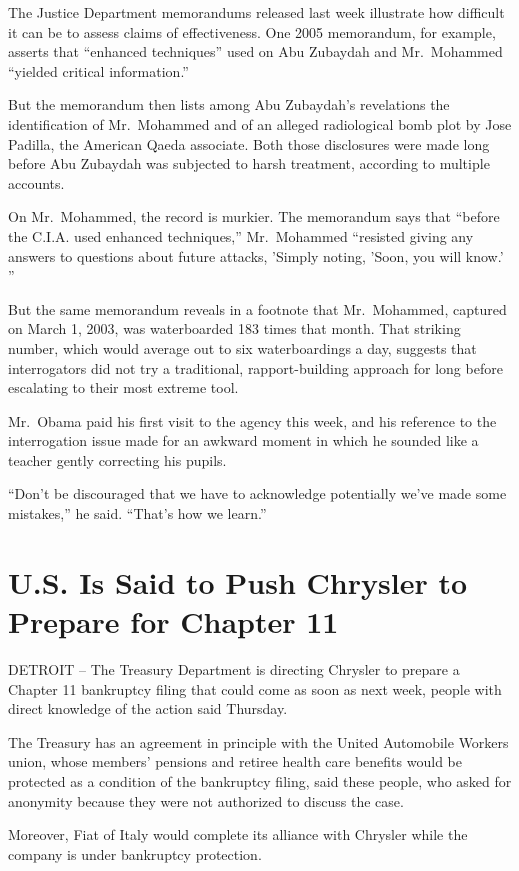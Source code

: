 \documentclass[12pt,a4paper,onecolumn]{article}
\begin{document}
The Justice Department memorandums released last week illustrate how difficult it can be to assess
claims of effectiveness. One 2005 memorandum, for example, asserts that ``enhanced techniques'' used
on Abu Zubaydah and Mr.~Mohammed ``yielded critical information.''

But the memorandum then lists among Abu Zubaydah's revelations the identification of Mr.~Mohammed
and of an alleged radiological bomb plot by Jose Padilla, the American Qaeda associate. Both those
disclosures were made long before Abu Zubaydah was subjected to harsh treatment, according to
multiple accounts.

On Mr.~Mohammed, the record is murkier. The memorandum says that ``before the C.I.A. used enhanced
techniques,'' Mr.~Mohammed ``resisted giving any answers to questions about future attacks, 'Simply
noting, 'Soon, you will know.' ''

But the same memorandum reveals in a footnote that Mr.~Mohammed, captured on March 1, 2003, was
waterboarded 183 times that month. That striking number, which would average out to six
waterboardings a day, suggests that interrogators did not try a traditional, rapport-building
approach for long before escalating to their most extreme tool.

Mr.~Obama paid his first visit to the agency this week, and his reference to the interrogation issue
made for an awkward moment in which he sounded like a teacher gently correcting his pupils.

``Don't be discouraged that we have to acknowledge potentially we've made some mistakes,'' he said.
``That's how we learn.''

\section{U.S. Is Said to Push Chrysler to Prepare for Chapter 11}

DETROIT -- The Treasury Department is directing Chrysler to prepare a Chapter 11 bankruptcy filing
that could come as soon as next week, people with direct knowledge of the action said Thursday.

The Treasury has an agreement in principle with the United Automobile Workers union, whose members'
pensions and retiree health care benefits would be protected as a condition of the bankruptcy
filing, said these people, who asked for anonymity because they were not authorized to discuss the
case.

Moreover, Fiat of Italy would complete its alliance with Chrysler while the company is under
bankruptcy protection.
\end{document}
